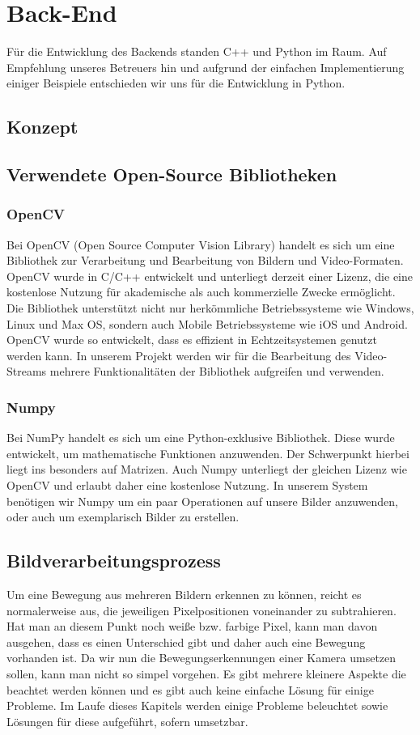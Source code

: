 \chapter{Back-End}
Für die Entwicklung des Backends standen C++ und Python im Raum. Auf Empfehlung unseres Betreuers hin und aufgrund der einfachen Implementierung einiger Beispiele entschieden wir uns für die Entwicklung in Python.
\section{Konzept}
\section{Verwendete Open-Source Bibliotheken}
\subsection{OpenCV}
Bei OpenCV (Open Source Computer Vision Library) handelt es sich um eine Bibliothek zur Verarbeitung und Bearbeitung von Bildern und Video-Formaten. OpenCV wurde in C/C++ entwickelt und unterliegt derzeit einer Lizenz, die eine kostenlose Nutzung für akademische als auch kommerzielle Zwecke ermöglicht. Die Bibliothek unterstützt nicht nur herkömmliche Betriebssysteme wie Windows, Linux und Max OS, sondern auch Mobile Betriebssysteme wie iOS und Android. OpenCV wurde so entwickelt, dass es effizient in Echtzeitsystemen genutzt werden kann. In unserem Projekt werden wir für die Bearbeitung des Video-Streams mehrere Funktionalitäten der Bibliothek aufgreifen und verwenden.
\subsection{Numpy}
Bei NumPy handelt es sich um eine Python-exklusive Bibliothek. Diese wurde entwickelt, um mathematische Funktionen anzuwenden. Der Schwerpunkt hierbei liegt ins besonders auf Matrizen. Auch Numpy unterliegt der gleichen Lizenz wie OpenCV und erlaubt daher eine kostenlose Nutzung. In unserem System benötigen wir Numpy um ein paar Operationen auf unsere Bilder anzuwenden, oder auch um exemplarisch Bilder zu erstellen.
\section{Bildverarbeitungsprozess}
Um eine Bewegung aus mehreren Bildern erkennen zu können, reicht es normalerweise aus, die jeweiligen Pixelpositionen voneinander zu subtrahieren. Hat man an diesem Punkt noch weiße bzw. farbige Pixel, kann man davon ausgehen, dass es einen Unterschied gibt und daher auch eine Bewegung vorhanden ist. Da wir nun die Bewegungserkennungen einer Kamera umsetzen sollen, kann man nicht so simpel vorgehen. Es gibt mehrere kleinere Aspekte die beachtet werden können und es gibt auch keine einfache Lösung für einige Probleme. Im Laufe dieses Kapitels werden einige Probleme beleuchtet sowie Lösungen für diese aufgeführt, sofern umsetzbar.


